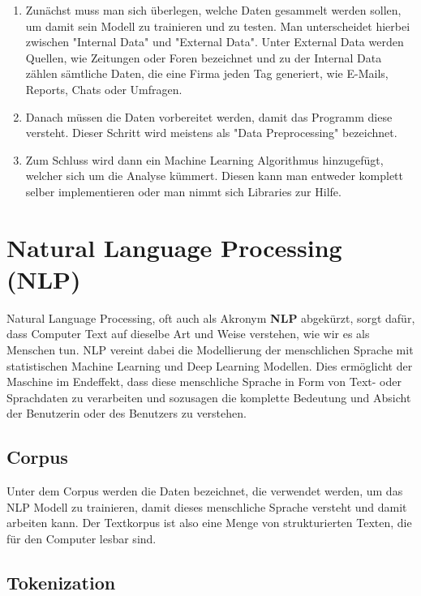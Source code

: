 \begin{enumerate}
    \item Zunächst muss man sich überlegen, welche Daten gesammelt werden sollen, um damit sein Modell zu trainieren und zu testen.
    Man unterscheidet hierbei zwischen "Internal Data" und "External Data".
    Unter External Data werden Quellen, wie Zeitungen oder Foren bezeichnet und zu der Internal Data zählen sämtliche Daten, die eine Firma jeden Tag generiert, wie E-Mails, Reports, Chats oder Umfragen.
    \item Danach müssen die Daten vorbereitet werden, damit das Programm diese versteht.
    Dieser Schritt wird meistens als "Data Preprocessing" bezeichnet.
    \item Zum Schluss wird dann ein Machine Learning Algorithmus hinzugefügt, welcher sich um die Analyse kümmert.
    Diesen kann man entweder komplett selber implementieren oder man nimmt sich Libraries zur Hilfe.\cite{machineLearningTextAnalysis}
\end{enumerate}

\section{Natural Language Processing (NLP)}

Natural Language Processing, oft auch als Akronym \textbf{NLP} abgekürzt, sorgt dafür, dass Computer Text auf dieselbe Art und Weise verstehen, wie wir es als Menschen tun.
NLP vereint dabei die Modellierung der menschlichen Sprache mit statistischen Machine Learning und Deep Learning Modellen.
Dies ermöglicht der Maschine im Endeffekt, dass diese menschliche Sprache in Form von Text- oder Sprachdaten zu verarbeiten und sozusagen die komplette Bedeutung und Absicht der Benutzerin oder des Benutzers zu verstehen.\cite{naturalLanguageProcessingIBM}

\subsection{Corpus}

Unter dem Corpus werden die Daten bezeichnet, die verwendet werden, um das NLP Modell zu trainieren, damit dieses menschliche Sprache versteht und damit arbeiten kann.
Der Textkorpus ist also eine Menge von strukturierten Texten, die für den Computer lesbar sind.\cite{corpus}


\subsection{Tokenization}

